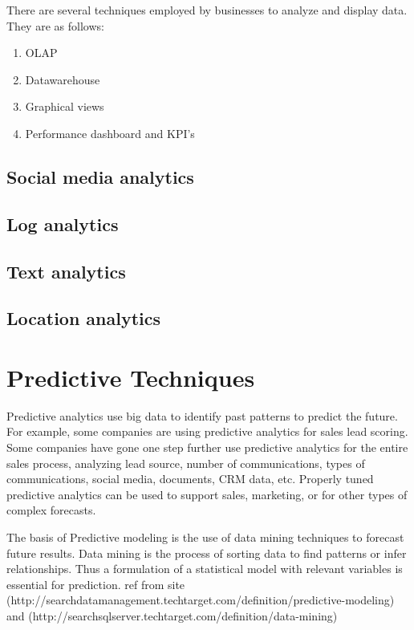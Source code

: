There are several techniques employed by businesses to analyze and display data. They are as follows:
\begin{enumerate}
	\item OLAP
	\item Datawarehouse
	\item Graphical views
	\item Performance dashboard and KPI's
\end{enumerate}

\section{Social media analytics}
\section{Log analytics}
\section{Text analytics}
\section{Location analytics}



%
%
%
%

\setlength{\footskip}{8mm}

\chapter{Predictive Techniques} 
\label{predictive-techniques}

Predictive analytics use big data to identify past patterns to predict the future. For example, some companies are using predictive analytics for sales lead scoring. Some companies have gone one step further use predictive analytics for the entire sales process, analyzing lead source, number of communications, types of communications, social media, documents, CRM data, etc. Properly tuned predictive analytics can be used to support sales, marketing, or for other types of complex forecasts.


The basis of Predictive modeling is the use of data mining techniques to forecast future results. Data mining is the process of sorting data to find patterns or infer relationships.
Thus a formulation of a statistical model with relevant variables is essential for prediction. 
ref from site (http://searchdatamanagement.techtarget.com/definition/predictive-modeling) and (http://searchsqlserver.techtarget.com/definition/data-mining)

